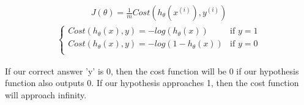 \documentclass{article}
\begin{document}
                \begin{align*}
                    J(\theta) = \frac{1}{m} Cost(h_{\theta}(x^{(i)}),y^{(i)}) 
                \end{align*}
                \vspace{-6pt}
                \begin{align*}
                    \begin{cases}
                        Cost(h_{\theta}(x),y) = -log(h_{\theta}(x)) & \mbox{if } y = 1 \\
                        Cost(h_{\theta}(x),y) = -log(1-h_{\theta}(x)) & \mbox{if } y = 0 \\
                    \end{cases}    
                \end{align*}
                
                \begin{center}
                    \centering
                    \qquad
                \end{center}

                If our correct answer 'y' is 0, then the cost function will be 0 if our hypothesis function also outputs 0. 
                If our hypothesis approaches 1, then the cost function will approach infinity.
\end{document}
